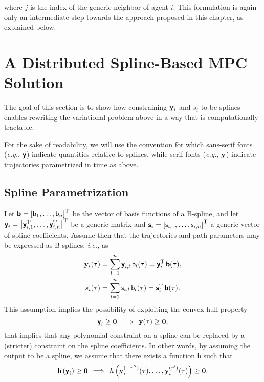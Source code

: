 \noindent where $j$ is the index of the generic neighbor of agent $i$. This formulation is again only an intermediate step towards the approach proposed in this chapter, as explained below. 



\section{A Distributed Spline-Based MPC Solution}
\label{sec:MPC_spline-based-MPC}



The goal of this section is to show how constraining $\mathbf{y}_i$ and $s_i$ to be splines enables rewriting the variational problem above in a way that is computationally tractable.

For the sake of readability, we will use the convention for which sans-serif fonts (\emph{e.g.}, $\boldsymbol{\mathsf{y}}$) indicate quantities relative to splines, while serif fonts (\emph{e.g.}, $\mathbf{y}$) indicate trajectories parametrized in time as above. %



\subsection{Spline Parametrization}
\label{ssec:MPC_spline_param}



Let $\boldsymbol{\mathsf{b}} = \left[\mathsf{b}_1, \ldots, \mathsf{b}_n\right]^{\mathrm{T}}$ be the vector of basis functions of a B-spline, and let $\boldsymbol{\mathsf{y}}_i = \left[\boldsymbol{\mathsf{y}}_{i,1}^{\mathrm{T}}, \ldots, \boldsymbol{\mathsf{y}}_{i,n}^{\mathrm{T}}\right]^{\mathrm{T}}$ be a generic matrix and $\boldsymbol{\mathsf{s}}_i = \left[\mathsf{s}_{i,1}, \ldots, \mathsf{s}_{i,n}\right]^{\mathrm{T}}$ a generic vector of spline coefficients. Assume then that the trajectories and path parameters may be expressed as B-splines, \emph{i.e.,} as
%
\begin{align}
    \mathbf{y}_i(\tau) &= \sum_{l=1}^n \boldsymbol{\mathsf{y}}_{i,l}\,\mathsf{b}_l(\tau) = \boldsymbol{\mathsf{y}}_i^{\mathrm{T}}\,\boldsymbol{\mathsf{b}}(\tau), \\
    s_i(\tau) &= \sum_{l=1}^n \mathsf{s}_{i,l}\,\mathsf{b}_l(\tau) = \boldsymbol{\mathsf{s}}_i^{\mathrm{T}}\,\boldsymbol{\mathsf{b}}(\tau).
\end{align}
%
This assumption implies the possibility of exploiting the convex hull property
\begin{equation}
    \boldsymbol{\mathsf{y}}_i \geq \bm{0} \, \implies \, \mathbf{y}(\tau) \geq \bm{0},
\end{equation}
that implies that any polynomial constraint on a spline can be replaced by a (stricter) constraint on the spline coefficients.
In other words, by assuming the output to be a spline, we assume that there exists a function $\mathsf{h}$ such that
\begin{equation}
    \mathsf{h}\left(\boldsymbol{\mathsf{y}}_i\right) \geq \bm{0}
    \, \implies \,
    h\left(\mathbf{y}_i^{(-r'')}(\tau), \ldots, \mathbf{y}^{(r')}_i(\tau)\right) \geq \bm{0}.
\end{equation}

